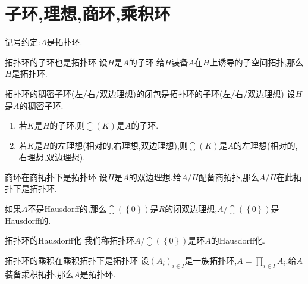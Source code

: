 \section{子环,理想,商环,乘积环}

记号约定:$A$是拓扑环.

\begin{proposition}{拓扑环的子环也是拓扑环}{}
	设$H$是$A$的子环.给$H$装备$A$在$H$上诱导的子空间拓扑,那么$H$是拓扑环.
\end{proposition}

\begin{proposition}{拓扑环的稠密子环(左/右/双边理想)的闭包是拓扑环的子环(左/右/双边理想)}{}
	设$H$是$A$的稠密子环.
	\begin{enumerate}
		\item 若$K$是$H$的子环,则$\closure\left(K\right)$是$A$的子环.
		\item 若$K$是$H$的左理想(相对的,右理想,双边理想),则$\closure\left(K\right)$是$A$的左理想(相对的,右理想,双边理想).
	\end{enumerate}
\end{proposition}

\begin{proposition}{商环在商拓扑下是拓扑环}{}
	设$H$是$A$的双边理想.给$A/H$配备商拓扑,那么$A/H$在此拓扑下是拓扑环.
\end{proposition}

\begin{proposition}{}{}
	如果$A$不是Hausdorff的,那么$\closure\left(\left\{0\right\}\right)$是$R$的闭双边理想,$A/\closure\left(\left\{0\right\}\right)$是Hausdorff的.
\end{proposition}

\begin{definition}{拓扑环的Hausdorff化}{}
	我们称拓扑环$A/\closure\left(\left\{0\right\}\right)$是环$A$的Hausdorff化.
\end{definition}

\begin{proposition}{拓扑环的乘积在乘积拓扑下是拓扑环}{}
	设$\left(A_{i}\right)_{i\in I}$是一族拓扑环,$A=\prod\limits_{i\in I}A_{i}$.给$A$装备乘积拓扑,那么$A$是拓扑环.
\end{proposition}